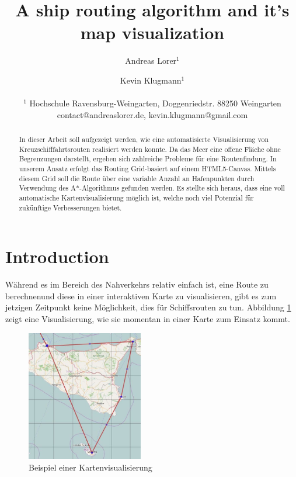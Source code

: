 \documentclass[letterpaper]{article}
\title{A ship routing algorithm and it's map visualization}
\author{Andreas Lorer$^{1}$ \and  Kevin Klugmann$^{1}$\\
\mbox{}\\
$^{1}$ Hochschule Ravensburg-Weingarten, Doggenriedstr. 88250 Weingarten \\
contact@andreaslorer.de, kevin.klugmann@gmail.com}
\begin{document}
\maketitle

\begin{abstract}
	In dieser Arbeit soll aufgezeigt werden, wie eine automatisierte Visualisierung von Kreuzschifffahrtsrouten realisiert werden konnte. Da das Meer eine offene Fläche ohne Begrenzungen darstellt, ergeben sich zahlreiche Probleme für eine Routenfindung. In unserem Ansatz erfolgt das Routing Grid-basiert auf einem HTML5-Canvas. Mittels diesem Grid soll die Route über eine variable Anzahl an Hafenpunkten durch Verwendung des A*-Algorithmus gefunden werden. Es stellte sich heraus, dass eine voll automatische Kartenvisualisierung möglich ist, welche noch viel Potenzial für zukünftige Verbesserungen bietet.
\end{abstract}

\section{Introduction}
	Während es im Bereich des Nahverkehrs relativ einfach ist, eine Route zu berechnen\footnotemark und diese in einer interaktiven Karte zu visualisieren, gibt es zum jetzigen Zeitpunkt keine Möglichkeit, dies für Schiffsrouten zu tun. Abbildung \ref{fig:visualisierungsproblem} zeigt eine Visualisierung, wie sie momentan in einer Karte zum Einsatz kommt. 


	\begin{figure}[!htb]
		\begin{center}
		\includegraphics[width=2in]{visualisierungsproblem}
		\caption{Beispiel einer Kartenvisualisierung}
		\label{fig:visualisierungsproblem}
		\end{center}
	\end{figure}
\end{document}

